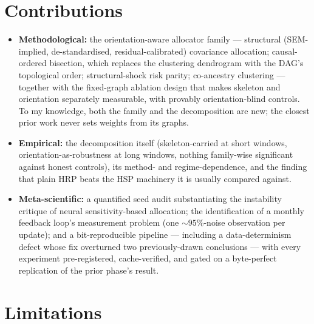 \section{Contributions}
\label{sec:contributions}

\begin{itemize}[itemsep=2pt]
  \item \textbf{Methodological:} the orientation-aware allocator family ---
        structural (SEM-implied, de-standardised, residual-calibrated)
        covariance allocation; causal-ordered bisection, which replaces the
        clustering dendrogram with the DAG's topological order;
        structural-shock risk parity; co-ancestry clustering --- together
        with the fixed-graph ablation design that makes skeleton and
        orientation separately measurable, with provably orientation-blind
        controls. To my knowledge, both the family and the decomposition are
        new; the closest prior work \cite{howard2025causal} never sets
        weights from its graphs.
  \item \textbf{Empirical:} the decomposition itself (skeleton-carried at
        short windows, orientation-as-robustness at long windows, nothing
        family-wise significant against honest controls), its method- and
        regime-dependence, and the finding that plain HRP beats the HSP
        machinery it is usually compared against.
  \item \textbf{Meta-scientific:} a quantified seed audit substantiating the
        instability critique of neural sensitivity-based allocation; the
        identification of a monthly feedback loop's measurement problem
        (one ${\sim}95\%$-noise observation per update); and a
        bit-reproducible pipeline --- including a data-determinism defect
        whose fix overturned two previously-drawn conclusions --- with every
        experiment pre-registered, cache-verified, and gated on a
        byte-perfect replication of the prior phase's result.
\end{itemize}

\section{Limitations}
\label{sec:limitations}

